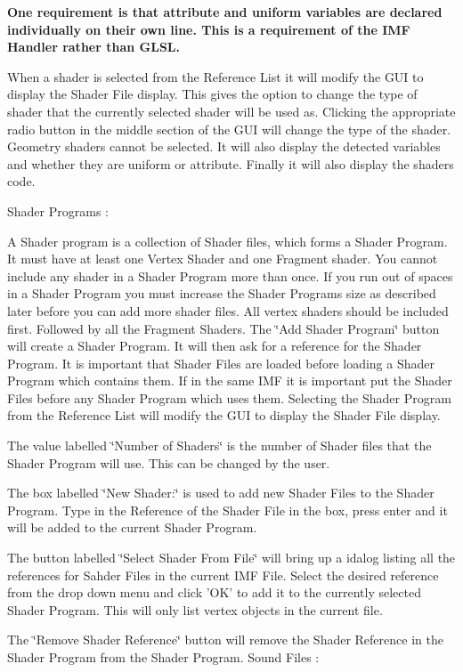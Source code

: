  {\bfseries  One requirement is that attribute and uniform variables are declared individually on their own line. This is a requirement of the IMF Handler rather than GLSL. } \par
 When a shader is selected from the Reference List it will modify the GUI to display the Shader File display. This gives the option to change the type of shader that the currently selected shader will be used as. Clicking the appropriate radio button in the middle section of the GUI will change the type of the shader. Geometry shaders cannot be selected. It will also display the detected variables and whether they are uniform or attribute. Finally it will also display the shaders code. \par
 Shader Programs : \par
 A Shader program is a collection of Shader files, which forms a Shader Program. It must have at least one Vertex Shader and one Fragment shader. You cannot include any shader in a Shader Program more than once. If you run out of spaces in a Shader Program you must increase the Shader Programs size as described later before you can add more shader files. All vertex shaders should be included first. Followed by all the Fragment Shaders. The \char`\"{}Add Shader Program\char`\"{} button will create a Shader Program. It will then ask for a reference for the Shader Program. It is important that Shader Files are loaded before loading a Shader Program which contains them. If in the same IMF it is important put the Shader Files before any Shader Program which uses them. Selecting the Shader Program from the Reference List will modify the GUI to display the Shader File display. \par
 The value labelled \char`\"{}Number of Shaders\char`\"{} is the number of Shader files that the Shader Program will use. This can be changed by the user. \par
 The box labelled \char`\"{}New Shader:\char`\"{} is used to add new Shader Files to the Shader Program. Type in the Reference of the Shader File in the box, press enter and it will be added to the current Shader Program. \par
 The button labelled \char`\"{}Select Shader From File\char`\"{} will bring up a idalog listing all the references for Sahder Files in the current IMF File. Select the desired reference from the drop down menu and click 'OK' to add it to the currently selected Shader Program. This will only list vertex objects in the current file. \par
 The \char`\"{}Remove Shader Reference\char`\"{} button will remove the Shader Reference in the Shader Program from the Shader Program. Sound Files : \par
